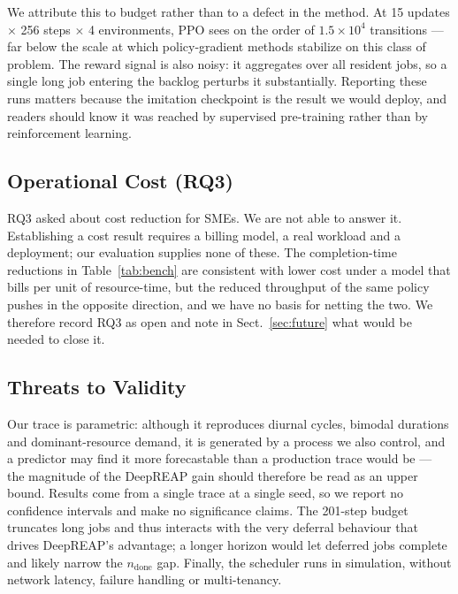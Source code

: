 \documentclass[runningheads]{llncs}
\begin{document}
We attribute this to budget rather than to a defect in the method. At
15 updates $\times$ 256 steps $\times$ 4 environments, PPO sees on the
order of $1.5 \times 10^4$ transitions --- far below the scale at which
policy-gradient methods stabilize on this class of problem. The
reward signal is also noisy: it aggregates over all resident jobs, so
a single long job entering the backlog perturbs it substantially.
Reporting these runs matters because the imitation checkpoint is the
result we would deploy, and readers should know it was reached by
supervised pre-training rather than by reinforcement learning.

\subsection{Operational Cost (RQ3)}

RQ3 asked about cost reduction for SMEs. We are not able to answer it.
Establishing a cost result requires a billing model, a real workload
and a deployment; our evaluation supplies none of these. The
completion-time reductions in Table~\ref{tab:bench} are consistent
with lower cost under a model that bills per unit of resource-time,
but the reduced throughput of the same policy pushes in the opposite
direction, and we have no basis for netting the two. We therefore
record RQ3 as open and note in Sect.~\ref{sec:future} what would be
needed to close it.

\subsection{Threats to Validity}

Our trace is parametric: although it reproduces diurnal cycles,
bimodal durations and dominant-resource demand, it is generated by a
process we also control, and a predictor may find it more forecastable
than a production trace would be --- the magnitude of the DeepREAP
gain should therefore be read as an upper bound. Results come from a
single trace at a single seed, so we report no confidence intervals
and make no significance claims. The 201-step budget truncates long
jobs and thus interacts with the very deferral behaviour that drives
DeepREAP's advantage; a longer horizon would let deferred jobs
complete and likely narrow the $n_{\text{done}}$ gap. Finally, the
scheduler runs in simulation, without network latency, failure
handling or multi-tenancy.
\end{document}

